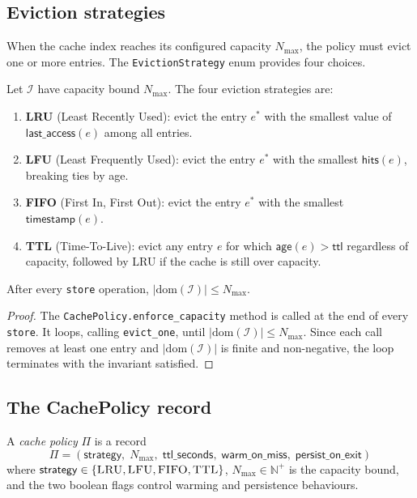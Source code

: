 \documentclass[11pt]{article}
\newcommand{\CacheIndex}{\mathcal{I}}              %
\newcommand{\CachePol}{\Pi}                        %
\newcommand{\LRU}{\textsc{LRU}}                    %
\newcommand{\LFU}{\textsc{LFU}}                    %
\newcommand{\FIFO}{\textsc{FIFO}}                  %
\newcommand{\TTL}{\textsc{TTL}}                    %
\begin{document}
\subsection{Eviction strategies}

When the cache index reaches its configured capacity $N_{\max}$, the
policy must evict one or more entries.  The \texttt{EvictionStrategy}
enum provides four choices.

\begin{definition}\label{def:eviction}
Let $\CacheIndex$ have capacity bound $N_{\max}$.  The four eviction
strategies are:
\begin{enumerate}[label=(\roman*)]
\item \textbf{\LRU} (Least Recently Used): evict the entry $e^*$ with
  the smallest value of $\mathsf{last\_access}(e)$ among all entries.
\item \textbf{\LFU} (Least Frequently Used): evict the entry $e^*$
  with the smallest $\mathsf{hits}(e)$, breaking ties by age.
\item \textbf{\FIFO} (First In, First Out): evict the entry $e^*$
  with the smallest $\mathsf{timestamp}(e)$.
\item \textbf{\TTL} (Time-To-Live): evict any entry $e$ for which
  $\mathsf{age}(e) > \mathsf{ttl}$ regardless of capacity,
  followed by \LRU{} if the cache is still over capacity.
\end{enumerate}
\end{definition}

\begin{proposition}\label{prop:capacity}
After every \texttt{store} operation, $|\mathrm{dom}(\CacheIndex)|
\le N_{\max}$.
\end{proposition}
\begin{proof}
The \texttt{CachePolicy.enforce\_capacity} method is called at the end
of every \texttt{store}.  It loops, calling \texttt{evict\_one}, until
$|\mathrm{dom}(\CacheIndex)| \le N_{\max}$.  Since each call removes
at least one entry and $|\mathrm{dom}(\CacheIndex)|$ is finite and
non-negative, the loop terminates with the invariant satisfied.
\end{proof}

\subsection{The CachePolicy record}

\begin{definition}\label{def:cache-policy}
A \emph{cache policy} $\CachePol$ is a record
\[
  \CachePol = (\mathsf{strategy},\; N_{\max},\; \mathsf{ttl\_seconds},\;
               \mathsf{warm\_on\_miss},\; \mathsf{persist\_on\_exit})
\]
where $\mathsf{strategy} \in \{\LRU, \LFU, \FIFO, \TTL\}$,
$N_{\max} \in \mathbb{N}^+$ is the capacity bound, and the two boolean
flags control warming and persistence behaviours.
\end{definition}
\end{document}
